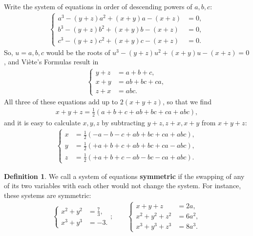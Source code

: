 \documentclass[12pt,a4paper]{memoir}
\theoremstyle{definition}
\newtheorem*{definition}{Definition}
\begin{document}
\begin{solution}
	Write the system of equations in order of descending powers of $a,b,c$:
	\begin{align*}
		\begin{cases}
			a^3-(y+z)a^2+(x+y)a-(x+z) &= 0,\\b^3-(y+z)b^2+(x+y)b-(x+z) &= 0,\\c^3-(y+z)c^2+(x+y)c-(x+z) &= 0.
		\end{cases}
	\end{align*}
	So, $u=a,b,c$ would be the roots of $u^3-(y+z)u^2+(x+y)u-(x+z)=0$, and Viète's Formulas result in
	\begin{align*}
		\begin{cases}
			y+z &= a+b+c,\\ x+y &= ab+bc+ca,\\ z+x &= abc. 
		\end{cases}
	\end{align*}
	All three of these equations add up to $2(x+y+z)$, so that we find
	\begin{align*}
		x+y+z = \frac{1}{2}\left(a+b+c+ab+bc+ca+abc\right),
	\end{align*}
	and it is easy to calculate $x,y,z$ by subtracting $y+z, z+x, x+y$ from $x+y+z$:
	\begin{align*}
		\begin{cases}
			x &= \frac{1}{2}\left(-a-b-c+ab+bc+ca+abc\right),\\
			y &= \frac{1}{2}\left(+a+b+c+ab+bc+ca-abc\right),\\
			z &= \frac{1}{2}\left(+a+b+c-ab-bc-ca+abc\right).
		\end{cases}
	\end{align*}
\end{solution}

\begin{tcolorbox}
	\begin{definition}
		We call a system of equations \textbf{symmetric} if the swapping of any of its two variables with each other would not change the system. For instance, these systems are symmetric:
		\begin{align*}
			\begin{cases}
				x^2+y^2 &=\frac{7}{3},\\x^3+y^3 &=-3.
			\end{cases}; \qquad
			\begin{cases}
				x+y+z &= 2a,\\ x^2+y^2+z^2 &=6a^2,\\ x^3+y^3+z^3 &= 8a^3.
			\end{cases}
		\end{align*}
	\end{definition}
\end{tcolorbox}
\end{document}
